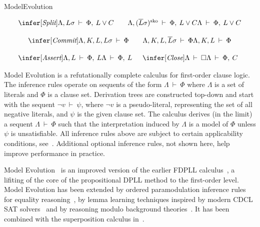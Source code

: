 \begin{entry}{ModelEvolution}




\begin{calculus}


\[
  \begin{array}{cc}
\multicolumn{2}{c}{
\infer[\textit{Split}]
{\Lambda, L\sigma\: \vdash\: \Phi,\: L \lor C\qquad \Lambda, (\overline{L}\sigma)^{\mathrm{sko}}\: \vdash\:  \Phi,\: L \lor C}
{\Lambda\: \vdash\:  \Phi,\: L \lor C}
}
    \\[3ex]
\multicolumn{2}{c}{
\infer[\textit{Commit}]
{{\Lambda, K, L, L\sigma}\:\vdash\:{\Phi} \qquad {\Lambda, K, L, \overline{L}\sigma}\:\vdash\:{\Phi}}
{{\Lambda, K, L}\:\vdash\:{\Phi}}
} \\[3ex]
\infer[\textit{Assert}]
{{\Lambda, L}\:\vdash\:{\Phi,\: L}}
{{\Lambda}\:\vdash\:{\Phi,\: L}}
&
\infer[\textit{Close}]
{{\Lambda}\:\vdash\:{\Box}}
{{\Lambda}\:\vdash\:{\Phi,\: C}}
  \end{array}
\]
\end{calculus}



\begin{clarifications}
Model Evolution is a refutationally complete calculus for first-order clause
logic. The inference rules operate on sequents of the form $\Lambda\:\vdash\:\Phi$ where $\Lambda$ is a
set of literals and $\Phi$ is a clause set. Derivation trees are constructed top-down
and start with the sequent $\neg v\:\vdash\:\psi$, where $\neg v$ is a pseudo-literal, representing
the set of all negative literals, and $\psi$ is the given clause set. The calculus
derives (in the limit) a sequent $\Lambda\:\vdash\:\Phi$ such that the interpretation induced by $\Lambda$ is a model
of $\Phi$ unless $\psi$ is unsatisfiable. All inference rules above are subject
to certain applicability conditions,
see~\cite{Baumgartner:Tinelli:ModelEvolutionCalculus:CADE:2003}.
Additional optional inference rules, not shown here, help improve performance in practice.
\end{clarifications}

\begin{history}
Model Evolution~\cite{Baumgartner:Tinelli:ModelEvolutionCalculus:CADE:2003}
is an improved version of the earlier FDPLL
calculus~\cite{Baumgartner:FDPLL:CADE:00}, a lifiting of the core of the
propositional DPLL method to the first-order level. Model Evolution has been extended by
ordered paramodulation inference rules for equality
reasoning~\cite{Baumgartner:Tinelli:ModelEvolutionCalculusEquality:CADE:2005}, by lemma
learning techniques inspired by modern CDCL SAT
solvers~\cite{Baumgartner:etal:ModelEvolutionLearning:LPAR:2006} and by 
reasoning modulo background
theories~\cite{Baumgartner:Fuchs:Tinelli:MELIA:LPAR:2008,Baumgartner:Tinelli:MEET:CADE:2011}. 
It has been combined with the superposition calculus in~\cite{Baumgartner:Waldmann:MESUP:CADE:2009}.
\end{history}


\end{entry}
